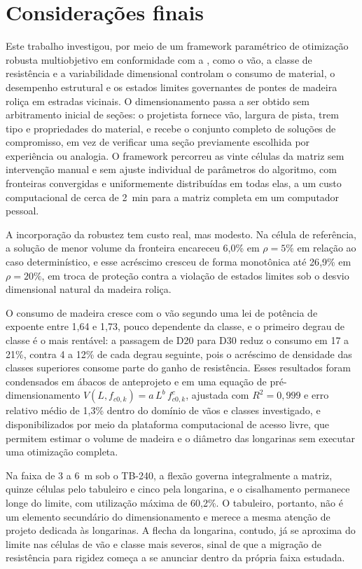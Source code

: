 \section{Considerações finais}\label{sec:conclusoes}

Este trabalho investigou, por meio de um framework paramétrico de otimização robusta multiobjetivo em conformidade com a \textcite{NBR7190-1:2022}, como o vão, a classe de resistência e a variabilidade dimensional controlam o consumo de material, o desempenho estrutural e os estados limites governantes de pontes de madeira roliça em estradas vicinais.
O dimensionamento passa a ser obtido sem arbitramento inicial de seções: o projetista fornece vão, largura de pista, trem tipo e propriedades do material, e recebe o conjunto completo de soluções de compromisso, em vez de verificar uma seção previamente escolhida por experiência ou analogia.
O framework percorreu as vinte células da matriz sem intervenção manual e sem ajuste individual de parâmetros do algoritmo, com fronteiras convergidas e uniformemente distribuídas em todas elas, a um custo computacional de cerca de 2~min para a matriz completa em um computador pessoal.

A incorporação da robustez tem custo real, mas modesto.
Na célula de referência, a solução de menor volume da fronteira encareceu 6{,}0\% em $\rho = 5\%$ em relação ao caso determinístico, e esse acréscimo cresceu de forma monotônica até 26{,}9\% em $\rho = 20\%$, em troca de proteção contra a violação de estados limites sob o desvio dimensional natural da madeira roliça.

O consumo de madeira cresce com o vão segundo uma lei de potência de expoente entre 1{,}64 e 1{,}73, pouco dependente da classe, e o primeiro degrau de classe é o mais rentável: a passagem de D20 para D30 reduz o consumo em 17 a 21\%, contra 4 a 12\% de cada degrau seguinte, pois o acréscimo de densidade das classes superiores consome parte do ganho de resistência.
Esses resultados foram condensados em ábacos de anteprojeto e em uma equação de pré-dimensionamento $V(L, f_{c0,k}) = a\,L^{b}\,f_{c0,k}^{c}$, ajustada com $R^2 = 0{,}999$ e erro relativo médio de 1{,}3\% dentro do domínio de vãos e classes investigado, e disponibilizados por meio da plataforma computacional de acesso livre, que permitem estimar o volume de madeira e o diâmetro das longarinas sem executar uma otimização completa.

Na faixa de 3 a 6~m sob o TB-240, a flexão governa integralmente a matriz, quinze células pelo tabuleiro e cinco pela longarina, e o cisalhamento permanece longe do limite, com utilização máxima de 60{,}2\%.
O tabuleiro, portanto, não é um elemento secundário do dimensionamento e merece a mesma atenção de projeto dedicada às longarinas.
A flecha da longarina, contudo, já se aproxima do limite nas células de vão e classe mais severos, sinal de que a migração de resistência para rigidez começa a se anunciar dentro da própria faixa estudada.

